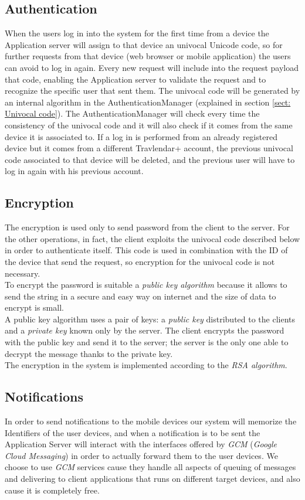 \subsection{Authentication}
\label{subsect:Authentication}
When the users log in into the system for the first time from a device the Application server will assign to that device an univocal Unicode code, so for further requests from that device (web browser or mobile application) the users can avoid to log in again. Every new request will include into the request payload that code, enabling the Application server to validate the request and to recognize the specific user that sent them. The univocal code will be generated by an internal algorithm in the AuthenticationManager (explained in section \ref{sect: Univocal code}). The AuthenticationManager will check every time the consistency of the univocal code and it will also check if it comes from the same device it is associated to.
If a log in is performed from an already registered device but it comes from a different Travlendar+ account, the previous univocal code associated to that device will be deleted, and the previous user will have to log in again with his previous account.

\subsection{Encryption}
\label{subsect:Encryption}
The encryption is used only to send password from the client to the server. For the other operations, in fact, the client exploits the univocal code described below in order to authenticate itself. This code is used in combination with the ID of the device that send the request, so encryption for the univocal code is not necessary.\\
To encrypt the password is suitable a \textit{public key algorithm} because it allows to send the string in a secure and easy way on internet and the size of data to encrypt is small.\\
A public key algorithm uses a pair of keys: a \textit{public key} distributed to the clients and a \textit{private key} known only by the server. The client encrypts the password with the public key and send it to the server; the server is the only one able to decrypt the message thanks to the private key.\\
The encryption in the system is implemented according to the \textit{RSA algorithm}.

\subsection{Notifications}
\label{subsect: Notifications}
In order to send notifications to the mobile devices our system will memorize the Identifiers of the user devices, and when a notification is to be sent the Application Server will interact with the interfaces offered by \textit{GCM} (\textit{Google Cloud Messaging}) in order to actually forward them to the user devices. We choose to use \textit{GCM} services cause they handle all aspects of queuing of messages and  delivering to client applications that runs on different target devices, and also cause it is completely free.

